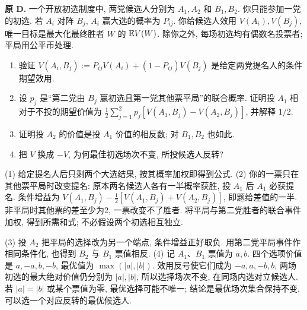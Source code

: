 \begin{exercise}\label{ex:P6.D}
\textbf{原 D.} 一个开放初选制度中, 两党候选人分别为 $A_1,A_2$ 和 $B_1,B_2$. 你只能参加一党的初选. 若 $A_i$ 对阵 $B_j$, $A_i$ 赢大选的概率为 $P_{ij}$. 你给候选人效用 $V(A_i),V(B_j)$, 唯一目标是最大化最终胜者 $W$ 的 $\mathbb E V(W)$. 除你之外, 每场初选均有偶数名投票者; 平局用公平币处理.
\begin{enumerate}[label=\arabic*.]
\item\label{part:P6.D.1} 验证 $V(A_i,B_j):=P_{ij}V(A_i)+(1-P_{ij})V(B_j)$ 是给定两党提名人的条件期望效用.
\item\label{part:P6.D.2} 设 $p_j$ 是“第二党由 $B_j$ 赢初选且第一党其他票平局”的联合概率. 证明投 $A_1$ 相对于不投的期望价值为
$\frac12\sum_{j=1}^2p_j[V(A_1,B_j)-V(A_2,B_j)]$, 并解释 $1/2$.
\item\label{part:P6.D.3} 证明投 $A_2$ 的价值是投 $A_1$ 价值的相反数; 对 $B_1,B_2$ 也如此.
\item\label{part:P6.D.4} 把 $V$ 换成 $-V$, 为何最佳初选场次不变, 所投候选人反转?
\end{enumerate}
\end{exercise}
\begin{solution}\label{sol:P6.D}
(1) 给定提名人后只剩两个大选结果, 按其概率加权即得到公式. (2) 你的一票只在其他票平局时改变提名: 原本两名候选人各有一半概率获胜, 投 $A_1$ 后 $A_1$ 必获提名. 条件增益为 $V(A_1,B_j)-\frac12[V(A_1,B_j)+V(A_2,B_j)]$, 即题给差值的一半. 非平局时其他票的差至少为2, 一票改变不了胜者. 将平局与第二党胜者的联合事件加权, 得到所需和式; 不必假设两个初选相互独立.

(3) 投 $A_2$ 把平局的选择改为另一个端点, 条件增益正好取负. 用第二党平局事件作相同条件化, 也得到 $B_2$ 与 $B_1$ 票值相反. (4) 记 $A_1$、$B_1$ 票值为 $a,b$. 四个选项价值是 $a,-a,b,-b$, 最优值为 $\max(|a|,|b|)$. 效用反号使它们成为 $-a,a,-b,b$, 两场初选的最大绝对价值仍分别为 $|a|,|b|$, 所以选择场次不变, 在同场内选对立候选人. 若 $|a|=|b|$ 或某个票值为零, 最优选择可能不唯一; 结论是最优场次集合保持不变, 可以选一个对应反转的最优候选人.
\end{solution}

